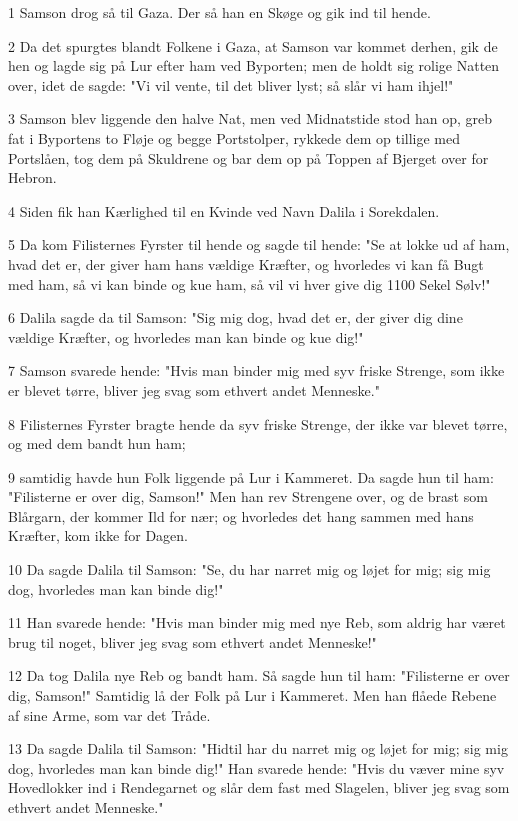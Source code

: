 \par 1 Samson drog så til Gaza. Der så han en Skøge og gik ind til hende.
\par 2 Da det spurgtes blandt Folkene i Gaza, at Samson var kommet derhen, gik de hen og lagde sig på Lur efter ham ved Byporten; men de holdt sig rolige Natten over, idet de sagde: "Vi vil vente, til det bliver lyst; så slår vi ham ihjel!"
\par 3 Samson blev liggende den halve Nat, men ved Midnatstide stod han op, greb fat i Byportens to Fløje og begge Portstolper, rykkede dem op tillige med Portslåen, tog dem på Skuldrene og bar dem op på Toppen af Bjerget over for Hebron.
\par 4 Siden fik han Kærlighed til en Kvinde ved Navn Dalila i Sorekdalen.
\par 5 Da kom Filisternes Fyrster til hende og sagde til hende: "Se at lokke ud af ham, hvad det er, der giver ham hans vældige Kræfter, og hvorledes vi kan få Bugt med ham, så vi kan binde og kue ham, så vil vi hver give dig 1100 Sekel Sølv!"
\par 6 Dalila sagde da til Samson: "Sig mig dog, hvad det er, der giver dig dine vældige Kræfter, og hvorledes man kan binde og kue dig!"
\par 7 Samson svarede hende: "Hvis man binder mig med syv friske Strenge, som ikke er blevet tørre, bliver jeg svag som ethvert andet Menneske."
\par 8 Filisternes Fyrster bragte hende da syv friske Strenge, der ikke var blevet tørre, og med dem bandt hun ham;
\par 9 samtidig havde hun Folk liggende på Lur i Kammeret. Da sagde hun til ham: "Filisterne er over dig, Samson!" Men han rev Strengene over, og de brast som Blårgarn, der kommer Ild for nær; og hvorledes det hang sammen med hans Kræfter, kom ikke for Dagen.
\par 10 Da sagde Dalila til Samson: "Se, du har narret mig og løjet for mig; sig mig dog, hvorledes man kan binde dig!"
\par 11 Han svarede hende: "Hvis man binder mig med nye Reb, som aldrig har været brug til noget, bliver jeg svag som ethvert andet Menneske!"
\par 12 Da tog Dalila nye Reb og bandt ham. Så sagde hun til ham: "Filisterne er over dig, Samson!" Samtidig lå der Folk på Lur i Kammeret. Men han flåede Rebene af sine Arme, som var det Tråde.
\par 13 Da sagde Dalila til Samson: "Hidtil har du narret mig og løjet for mig; sig mig dog, hvorledes man kan binde dig!" Han svarede hende: "Hvis du væver mine syv Hovedlokker ind i Rendegarnet og slår dem fast med Slagelen, bliver jeg svag som ethvert andet Menneske."
